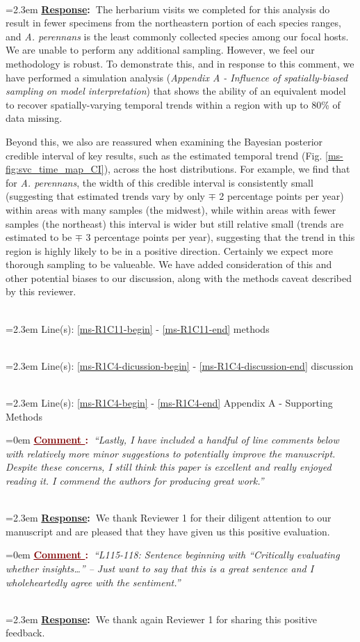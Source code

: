 \documentclass[12pt]{article}
\newcounter{cN}
\newcommand{\comment}[1]{
	\vspace{2em}
	\refstepcounter{cN} %
	\noindent \hangindent=0em \textbf{\textcolor{Maroon}{\uline{Comment \thecN}:~}}\emph{``#1''}
	}
\newcommand{\response}[1]{
	\\[0.25em]
	\hangindent=2.3em \textbf{\textcolor{NavyBlue}{\uline{Response}:~}}#1
	}
\newcommand{\linesref}[2]{
		\\[0.25em]
	\hangindent=2.3em {\color{Mahogany} Line(s): \ref{#1} - \ref{#2}}
}
\begin{document}
\response{The herbarium visits we completed for this analysis do result in fewer specimens from the northeastern portion of each species ranges, and \emph{A. perennans} is the least commonly collected species among our focal hosts. 
We are unable to perform any additional sampling. 
However, we feel our methodology is robust. 
To demonstrate this, and in response to this comment, we have performed a simulation analysis (\emph{Appendix A - Influence of spatially-biased sampling on model interpretation}) that shows the ability of an equivalent model to recover spatially-varying temporal trends within a region with up to $80$\% of data missing. 
	
Beyond this, we also are reassured when examining the Bayesian posterior credible interval of key results, such as the estimated temporal trend (Fig. \ref{ms-fig:svc_time_map_CI}), across the  host distributions.
For example, we find that for \emph{A. perennans}, the width of this credible interval is consistently small (suggesting that estimated trends vary by only $\mp$ 2 percentage points per year) within areas with many samples (the midwest), while within areas with fewer samples (the northeast) this interval is wider but still relative small (trends are estimated to be $\mp$ 3 percentage points per year), suggesting that the trend in this region is highly likely to be in a positive direction. Certainly we expect more thorough sampling to be valueable. 
We have added consideration of this and other potential biases to our discussion, along with the methods caveat described by this reviewer.}
\linesref{ms-R1C11-begin}{ms-R1C11-end} methods
\linesref{ms-R1C4-dicussion-begin}{ms-R1C4-discussion-end} discussion
\linesref{ms-R1C4-begin}{ms-R1C4-end} Appendix A - Supporting Methods


\comment{Lastly, I have included a handful of line comments below with relatively more minor suggestions to potentially improve the manuscript.\\
Despite these concerns, I still think this paper is excellent and really enjoyed reading it. I commend the authors for producing great work.}
\response{We thank Reviewer 1 for their diligent attention to our manuscript and are pleased that they have given us this positive evaluation.}


\comment{L115-118: Sentence beginning with “Critically evaluating whether insights…” – Just want to say that this is a great sentence and I wholeheartedly agree with the sentiment.}
\response{We thank again Reviewer 1 for sharing this positive feedback.}
\end{document}
